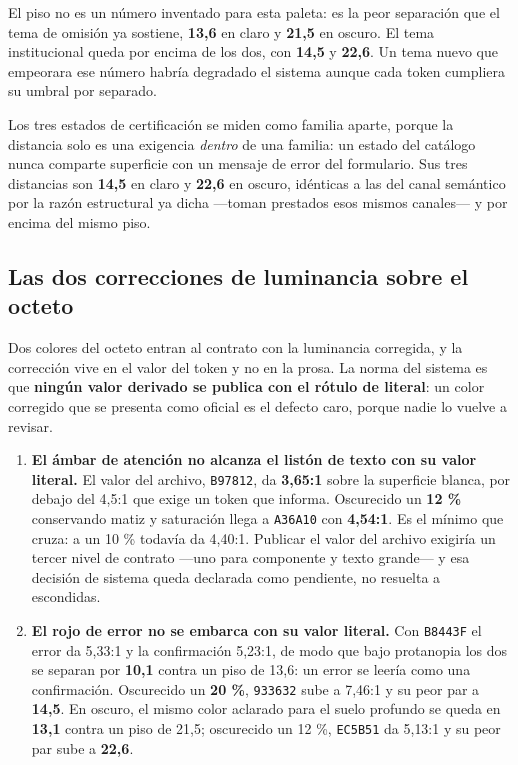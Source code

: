 El piso no es un número inventado para esta paleta: es la peor separación que el tema de omisión ya
sostiene, \textbf{13{,}6} en claro y \textbf{21{,}5} en oscuro. El tema institucional queda por
encima de los dos, con \textbf{14{,}5} y \textbf{22{,}6}. Un tema nuevo que empeorara ese número
habría degradado el sistema aunque cada token cumpliera su umbral por separado.

Los tres estados de certificación se miden como familia aparte, porque la distancia solo es una
exigencia \emph{dentro} de una familia: un estado del catálogo nunca comparte superficie con un
mensaje de error del formulario. Sus tres distancias son \textbf{14{,}5} en claro y \textbf{22{,}6}
en oscuro, idénticas a las del canal semántico por la razón estructural ya dicha ---toman prestados
esos mismos canales--- y por encima del mismo piso.

\subsection{Las dos correcciones de luminancia sobre el octeto}

Dos colores del octeto entran al contrato con la luminancia corregida, y la corrección vive en el
valor del token y no en la prosa. La norma del sistema es que \textbf{ningún valor derivado se
publica con el rótulo de literal}: un color corregido que se presenta como oficial es el defecto
caro, porque nadie lo vuelve a revisar.

\begin{enumerate}[leftmargin=*,itemsep=5pt,topsep=6pt]
\item \textbf{El ámbar de atención no alcanza el listón de texto con su valor literal.} El valor del archivo,
  \texttt{B97812}, da \textbf{3{,}65:1} sobre la superficie blanca, por debajo del 4{,}5:1 que exige
  un token que informa. Oscurecido un \textbf{12 \%} conservando matiz y saturación llega a
  \texttt{A36A10} con \textbf{4{,}54:1}. Es el mínimo que cruza: a un 10 \% todavía da 4{,}40:1.
  Publicar el valor del archivo exigiría un tercer nivel de contrato ---uno para componente y texto
  grande--- y esa decisión de sistema queda declarada como pendiente, no resuelta a escondidas.
\item \textbf{El rojo de error no se embarca con su valor literal.} Con \texttt{B8443F} el error da
  5{,}33:1 y la confirmación 5{,}23:1, de modo que bajo protanopia los dos se separan por
  \textbf{10{,}1} contra un piso de 13{,}6: un error se leería como una confirmación. Oscurecido un
  \textbf{20 \%}, \texttt{933632} sube a 7{,}46:1 y su peor par a \textbf{14{,}5}. En oscuro, el
  mismo color aclarado para el suelo profundo se queda en \textbf{13{,}1} contra un piso de
  21{,}5; oscurecido un 12 \%, \texttt{EC5B51} da 5{,}13:1 y su peor par sube a \textbf{22{,}6}.
\end{enumerate}

